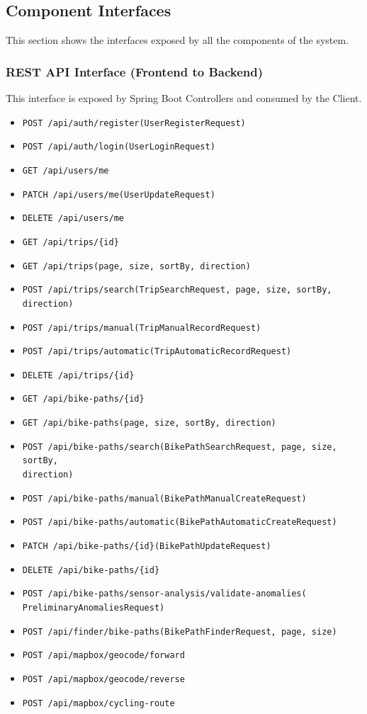 \clearpage

\subsection{Component Interfaces}
This section shows the interfaces exposed by all the components of the system.

\subsubsection{REST API Interface (Frontend to Backend)}
This interface is exposed by Spring Boot Controllers and consumed by the Client.
\begin{itemize}
    \item \texttt{POST /api/auth/register(UserRegisterRequest)}
    \item \texttt{POST /api/auth/login(UserLoginRequest)}
    \item \texttt{GET /api/users/me}
    \item \texttt{PATCH /api/users/me(UserUpdateRequest)}
    \item \texttt{DELETE /api/users/me}
    \item \texttt{GET /api/trips/\{id\}}
    \item \texttt{GET /api/trips(page, size, sortBy, direction)}
    \item \texttt{POST /api/trips/search(TripSearchRequest, page, size, sortBy, direction)}
    \item \texttt{POST /api/trips/manual(TripManualRecordRequest)}
    \item \texttt{POST /api/trips/automatic(TripAutomaticRecordRequest)}
    \item \texttt{DELETE /api/trips/\{id\}}
    \item \texttt{GET /api/bike-paths/\{id\}}
    \item \texttt{GET /api/bike-paths(page, size, sortBy, direction)}
    \item \texttt{POST /api/bike-paths/search(BikePathSearchRequest, page, size, sortBy, \\ direction)}
    \item \texttt{POST /api/bike-paths/manual(BikePathManualCreateRequest)}
    \item \texttt{POST /api/bike-paths/automatic(BikePathAutomaticCreateRequest)}
    \item \texttt{PATCH /api/bike-paths/\{id\}(BikePathUpdateRequest)}
    \item \texttt{DELETE /api/bike-paths/\{id\}}
    \item \texttt{POST /api/bike-paths/sensor-analysis/validate-anomalies( \\ PreliminaryAnomaliesRequest)}
    \item \texttt{POST /api/finder/bike-paths(BikePathFinderRequest, page, size)}
    \item \texttt{POST /api/mapbox/geocode/forward}
    \item \texttt{POST /api/mapbox/geocode/reverse}
    \item \texttt{POST /api/mapbox/cycling-route}
\end{itemize}

